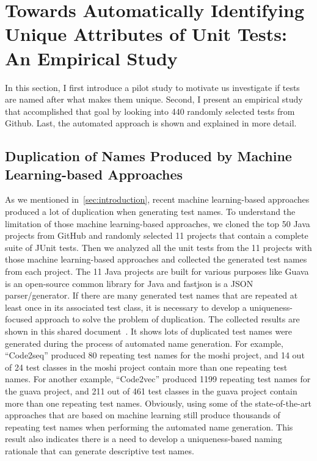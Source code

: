 \section{Towards Automatically Identifying Unique Attributes of Unit Tests: An Empirical Study}

In this section, I first introduce a pilot study to motivate us investigate if tests are named after what makes them unique.
%
Second, I present an empirical study that accomplished that goal by looking into \num{440} randomly selected tests from Github.
%
Last, the automated approach is shown and explained in more detail.


\subsection{Duplication of Names Produced by Machine Learning-based Approaches}
\label{sec:duplication-names}

As we mentioned in~\cref{sec:introduction}, recent machine learning-based approaches produced a lot of duplication when generating test names.
%
To understand the limitation of those machine learning-based approaches, we cloned the top \num{50} Java projects from GitHub and randomly selected \num{11} projects that contain a complete suite of JUnit tests.
%
Then we analyzed all the unit tests from the \num{11} projects with those machine learning-based approaches and collected the generated test names from each project.
%
The \num{11} Java projects are built for various purposes like Guava is an open-source common library for Java and fastjson is a JSON parser\slash generator.
%
If there are many generated test names that are repeated at least once in its associated test class, it is necessary to develop a uniqueness-focused approach to solve the problem of duplication.
%
The collected results are shown in this shared document~\cite{CodeResult}.
%
It shows lots of duplicated test names were generated during the process of automated name generation. 
%
For example, \enquote{Code2seq} produced \num{80} repeating test names for the moshi project, and \num{14} out of \num{24} test classes in the moshi project contain more than one repeating test names.
%
For another example, \enquote{Code2vec} produced \num{1199} repeating test names for the guava project, and \num{211} out of \num{461} test classes in the guava project contain more than one repeating test names.
%
Obviously, using some of the state-of-the-art approaches that are based on machine learning still produce thousands of repeating test names when performing the automated name generation.
%
This result also indicates there is a need to develop a uniqueness-based naming rationale that can generate descriptive test names.


